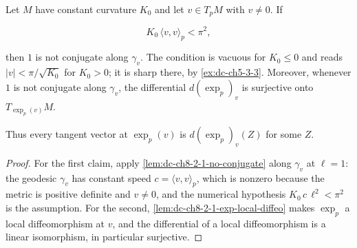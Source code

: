 \begin{lemma}
  \label{lem:dc-ch8-2-1-no-conjugate-ball}
  \leanok
  Let $M$ have constant curvature $K_0$ and let $v\in T_pM$ with $v\neq 0$. If

  $$
  K_0\,\langle v,v\rangle_p<\pi^2 ,
  $$

  then $1$ is not conjugate along $\gamma_v$. The condition is vacuous for $K_0\leq 0$ and reads
  $|v|<\pi/\sqrt{K_0}$ for $K_0>0$; it is sharp there, by \cref{ex:dc-ch5-3-3}. Moreover, whenever
  $1$ is not conjugate along $\gamma_v$, the differential $d(\exp_p)_v$ is surjective onto
  $T_{\exp_p(v)}M$.

  Thus every tangent vector at $\exp_p(v)$ is $d(\exp_p)_v(Z)$ for some $Z$.
\end{lemma}
\begin{proof}
  \leanok
\sketch
  For the first claim, apply \cref{lem:dc-ch8-2-1-no-conjugate} along $\gamma_v$ at $\ell=1$: the
  geodesic $\gamma_v$ has constant speed $c=\langle v,v\rangle_p$, which is nonzero because the
  metric is positive definite and $v\neq 0$, and the numerical hypothesis
  $K_0\,c\,\ell^2<\pi^2$ is the assumption. For the second, \cref{lem:dc-ch8-2-1-exp-local-diffeo}
  makes $\exp_p$ a local diffeomorphism at $v$, and the differential of a local diffeomorphism is
  a linear isomorphism, in particular surjective.
\end{proof}

